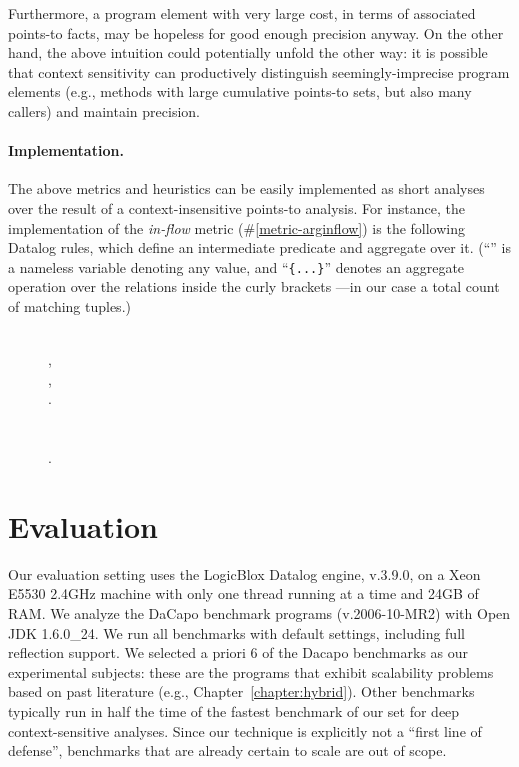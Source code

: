 Furthermore, a program element with very large cost, in terms of associated points-to facts, may be hopeless for good enough precision anyway. On the other hand, the above intuition could potentially unfold the other way: it is possible that context sensitivity can productively distinguish seemingly-imprecise program elements (e.g., methods with large cumulative points-to sets, but also many callers) and maintain precision.

\paragraph*{Implementation.}
The above metrics and heuristics can be easily implemented as short analyses over the result of a context-insensitive points-to analysis. For instance, the implementation of the \emph{in-flow} metric (\#\ref{metric-arginflow}) is the following Datalog rules, which define an intermediate predicate and aggregate over it. (``\args{\_}'' is a nameless variable denoting any value, and ``\texttt{\{...\}}'' denotes an aggregate operation over the relations inside the curly brackets ---in our case a total count of matching tuples.)

\begin{figure}[h]
\begin{datalog}
 \dlIf{} \\
    ,\\
    ,\\
    .\\
\\
 \dlIf{} \\
    .
\end{datalog}
\end{figure}




\section{Evaluation}

Our evaluation setting uses the LogicBlox Datalog engine, v.3.9.0, on a Xeon E5530 2.4GHz machine with only one thread running at a time and 24GB of RAM. We analyze the DaCapo benchmark programs (v.2006-10-MR2) with Open JDK 1.6.0\_24. We run all benchmarks with default \doop{} settings, including full reflection support. We selected a priori 6 of the Dacapo benchmarks as our experimental subjects: these are the programs that exhibit scalability problems based on past literature (e.g., Chapter~\ref{chapter:hybrid}). Other benchmarks typically run in half the time of the fastest benchmark of our set for deep context-sensitive analyses. Since our technique is explicitly not a ``first line of defense'', benchmarks that are already certain to scale are out of scope.

